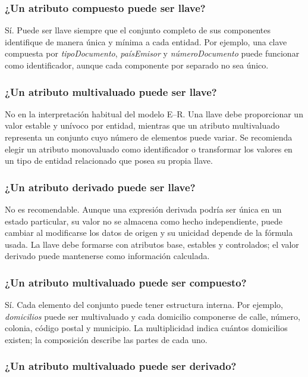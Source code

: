 \subsubsection{¿Un atributo compuesto puede ser llave?}

Sí. Puede ser llave siempre que el conjunto completo de sus componentes
identifique de manera única y mínima a cada entidad. Por ejemplo, una clave
compuesta por \emph{tipoDocumento}, \emph{paísEmisor} y
\emph{númeroDocumento} puede funcionar como identificador, aunque cada
componente por separado no sea único.

\subsubsection{¿Un atributo multivaluado puede ser llave?}

No en la interpretación habitual del modelo E--R. Una llave debe proporcionar
un valor estable y unívoco por entidad, mientras que un atributo multivaluado
representa un conjunto cuyo número de elementos puede variar. Se recomienda
elegir un atributo monovaluado como identificador o transformar los valores en
un tipo de entidad relacionado que posea su propia llave.

\subsubsection{¿Un atributo derivado puede ser llave?}

No es recomendable. Aunque una expresión derivada podría ser única en un estado
particular, su valor no se almacena como hecho independiente, puede cambiar al
modificarse los datos de origen y su unicidad depende de la fórmula usada. La
llave debe formarse con atributos base, estables y controlados; el valor
derivado puede mantenerse como información calculada.

\subsubsection{¿Un atributo multivaluado puede ser compuesto?}

Sí. Cada elemento del conjunto puede tener estructura interna. Por ejemplo,
\emph{domicilios} puede ser multivaluado y cada domicilio componerse de calle,
número, colonia, código postal y municipio. La multiplicidad indica cuántos
domicilios existen; la composición describe las partes de cada uno.

\subsubsection{¿Un atributo multivaluado puede ser derivado?}

